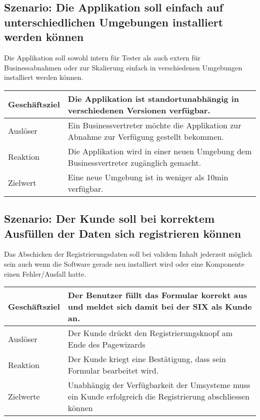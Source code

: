 \subsection{Szenario: Die Applikation soll einfach auf unterschiedlichen Umgebungen installiert werden können}

Die Applikation soll sowohl intern für Tester als auch extern für Businessabnahmen oder zur Skalierung einfach in verschiedenen Umgebungen installiert werden können.

\begin{table}[H]
	\centering
	\begin{tabular}{ | p{3cm} | p{11cm} | }
		\toprule
		Geschäftsziel & Die Applikation ist standortunabhängig in verschiedenen Versionen verfügbar. \\ \hline
		Auslöser & Ein Businessvertreter möchte die Applikation zur Abnahme zur Verfügung gestellt bekommen. \\ \hline
		Reaktion & Die Applikation wird in einer neuen Umgebung dem Businessvertreter zugänglich gemacht. \\ \hline
		Zielwert & Eine neue Umgebung ist in weniger als 10min verfügbar. \\
		\bottomrule
	\end{tabular}
\end{table}

\subsection{Szenario: Der Kunde soll bei korrektem Ausfüllen der Daten sich registrieren können}

Das Abschicken der Registrierungsdaten soll bei validem Inhalt jederzeit möglich sein auch wenn die Software gerade neu installiert wird oder eine Komponente einen Fehler/Ausfall hatte.

\begin{table}[H]
	\centering
	\begin{tabular}{ | p{3cm} | p{11cm} | }
		\toprule
		Geschäftsziel & Der Benutzer füllt das Formular korrekt aus und meldet sich damit bei der SIX als Kunde an. \\ \hline
		Auslöser & Der \Gls{Kunde} drückt den Registrierungsknopf am Ende des Pagewizards \\  \hline
		Reaktion & Der Kunde kriegt eine Bestätigung, dass sein Formular bearbeitet wird. \\ \hline
		Zielwerte & Unabhängig der Verfügbarkeit der Umsysteme muss ein Kunde erfolgreich die Registrierung abschliessen können \\
		\bottomrule
	\end{tabular}
\end{table}
\newpage

